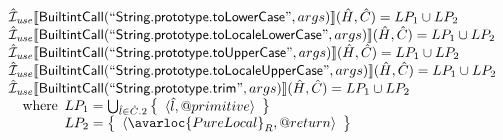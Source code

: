 \[\begin{array}{l}
\aI_{\it use}\lbr \SF{BuiltintCall}(``\SF{String.prototype.toLowerCase}",args)\rbr(\hat{H},\hat{C}) = LP_1 \cup LP_2\\
\aI_{\it use}\lbr \SF{BuiltintCall}(``\SF{String.prototype.toLocaleLowerCase}",args)\rbr(\hat{H},\hat{C}) = LP_1 \cup LP_2\\
\aI_{\it use}\lbr \SF{BuiltintCall}(``\SF{String.prototype.toUpperCase}",args)\rbr(\hat{H},\hat{C}) = LP_1 \cup LP_2\\
\aI_{\it use}\lbr \SF{BuiltintCall}(``\SF{String.prototype.toLocaleUpperCase}",args)\rbr(\hat{H},\hat{C}) = LP_1 \cup LP_2\\
\aI_{\it use}\lbr \SF{BuiltintCall}(``\SF{String.prototype.trim}",args)\rbr(\hat{H},\hat{C}) = LP_1 \cup LP_2\\
\quad\wherec{
  LP_1 = \bigcup_{\hat{l} \in \hat{C}.2} \set{\langle \hat{l},\varprop{primitive} \rangle}\\
  LP_2 = \set{\langle\avarloc{PureLocal}_R,\varprop{return}\rangle}\\
  }\\
\\
\end{array}
\]



